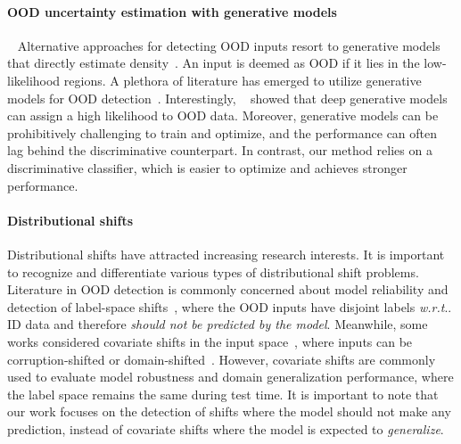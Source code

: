 \documentclass{article}
\makeatletter
\DeclareRobustCommand\onedot{\futurelet\@let@token\@onedot}
\def\@onedot{\ifx\@let@token.\else.\null\fi\xspace}
\def\wrt{\emph{w.r.t}\onedot} \def\dof{d.o.f\onedot}
\makeatother
\begin{document}
\paragraph{OOD uncertainty estimation with generative models} ~ Alternative approaches for detecting OOD inputs resort to generative models that directly estimate density~\cite{dinh2017density,huang2017stacked, kingma2014autoencoding, oord2016conditional, rezende2014stochastic,  tabak2013family}. An input is deemed as OOD if it lies in the low-likelihood regions. A plethora of literature has emerged to utilize generative models for OOD detection~\cite{ kirichenko2020normalizing, ren2019likelihood, schirrmeister2020understanding, serra2019input, wang2020further, winkens2020contrastive, xiao2020likelihood}.
Interestingly, \citeauthor{nalisnick2018deep}~\cite{nalisnick2018deep} showed that deep generative models can assign a high likelihood to OOD data.
Moreover, generative models can be prohibitively challenging to train and optimize, and the performance can often lag behind the discriminative counterpart. In contrast, our method relies on a discriminative classifier, which is easier to optimize and achieves stronger performance. 






\vspace{-0.2cm}
\paragraph{Distributional shifts} Distributional shifts have attracted increasing research interests. It is important to recognize and differentiate various types of distributional shift problems. Literature in OOD detection is commonly concerned about model reliability and detection of label-space shifts~\cite{hendrycks2016baseline, liang2018enhancing, liu2020energy}, where the OOD inputs have disjoint labels \wrt ID data and therefore \emph{should not be predicted by the model}. Meanwhile, some works considered covariate shifts in the input space~\citep{hendrycks2019benchmarking, malinin2021shifts, ovadia2019can}, where inputs can be corruption-shifted or domain-shifted~\citep{hsu2020generalized}. However, covariate shifts are commonly used to evaluate model robustness and domain generalization performance, where the label space  remains the same during test time. It is important to note that our work focuses on the detection of shifts where the model should not make any prediction, instead of covariate shifts where the model is expected to \emph{generalize}. 
\end{document}
